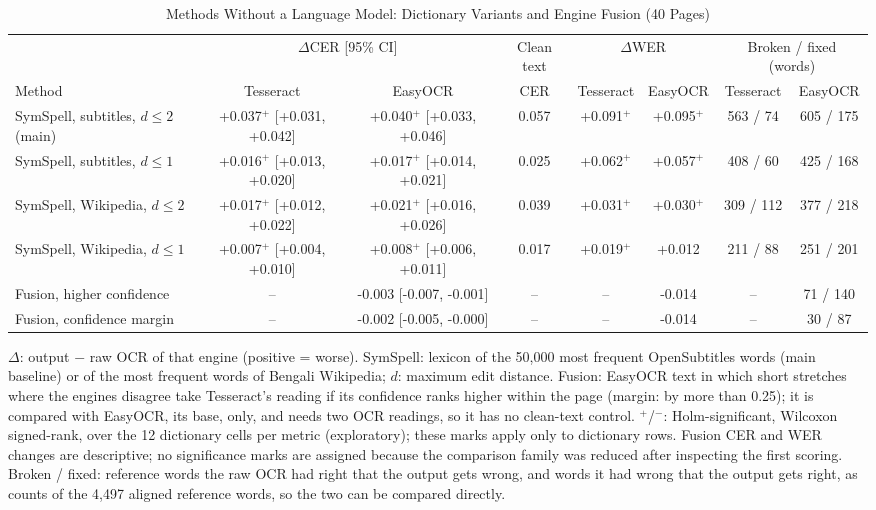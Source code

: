 \begin{table}[t]
\centering
\caption{Methods Without a Language Model: Dictionary Variants and Engine Fusion (40 Pages)}
\label{tab:classical}
\setlength{\tabcolsep}{4pt}
\footnotesize
\begin{tabular}{lccccccc}
\toprule
 & \multicolumn{2}{c}{$\Delta$CER [95\% CI]} & Clean text & \multicolumn{2}{c}{$\Delta$WER} & \multicolumn{2}{c}{Broken / fixed (words)} \\
\cmidrule(lr){2-3}\cmidrule(lr){4-4}\cmidrule(lr){5-6}\cmidrule(lr){7-8}
Method & Tesseract & EasyOCR & CER & Tesseract & EasyOCR & Tesseract & EasyOCR \\
\midrule
SymSpell, subtitles, $d\le2$ (main) & +0.037$^{+}$ [+0.031, +0.042] & +0.040$^{+}$ [+0.033, +0.046] & 0.057 & +0.091$^{+}$ & +0.095$^{+}$ & 563 / 74 & 605 / 175 \\
SymSpell, subtitles, $d\le1$ & +0.016$^{+}$ [+0.013, +0.020] & +0.017$^{+}$ [+0.014, +0.021] & 0.025 & +0.062$^{+}$ & +0.057$^{+}$ & 408 / 60 & 425 / 168 \\
SymSpell, Wikipedia, $d\le2$ & +0.017$^{+}$ [+0.012, +0.022] & +0.021$^{+}$ [+0.016, +0.026] & 0.039 & +0.031$^{+}$ & +0.030$^{+}$ & 309 / 112 & 377 / 218 \\
SymSpell, Wikipedia, $d\le1$ & +0.007$^{+}$ [+0.004, +0.010] & +0.008$^{+}$ [+0.006, +0.011] & 0.017 & +0.019$^{+}$ & +0.012 & 211 / 88 & 251 / 201 \\
\midrule
Fusion, higher confidence & -- & -0.003 [-0.007, -0.001] & -- & -- & -0.014 & -- & 71 / 140 \\
Fusion, confidence margin & -- & -0.002 [-0.005, -0.000] & -- & -- & -0.014 & -- & 30 / 87 \\
\bottomrule
\end{tabular}
\par\smallskip
\begin{minipage}{\linewidth}\footnotesize $\Delta$: output $-$ raw OCR of that engine (positive = worse). SymSpell: lexicon of the 50{,}000 most frequent OpenSubtitles words (main baseline) or of the most frequent words of Bengali Wikipedia; $d$: maximum edit distance. Fusion: EasyOCR text in which short stretches where the engines disagree take Tesseract's reading if its confidence ranks higher within the page (margin: by more than 0.25); it is compared with EasyOCR, its base, only, and needs two OCR readings, so it has no clean-text control. $^{+}$/$^{-}$: Holm-significant, Wilcoxon signed-rank, over the 12 dictionary cells per metric (exploratory); these marks apply only to dictionary rows. Fusion CER and WER changes are descriptive; no significance marks are assigned because the comparison family was reduced after inspecting the first scoring. Broken / fixed: reference words the raw OCR had right that the output gets wrong, and words it had wrong that the output gets right, as counts of the 4{,}497 aligned reference words, so the two can be compared directly.\end{minipage}
\end{table}
